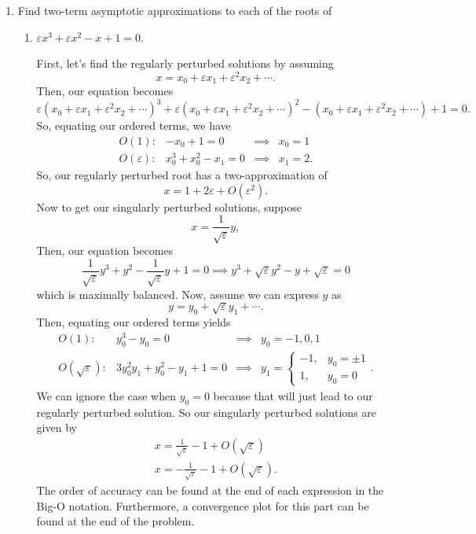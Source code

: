 \documentclass[a4paper,12pt]{article}
\newcommand{\eps}{\varepsilon}
\begin{document}
\begin{enumerate}[label = \arabic*)]
    \item Find two-term asymptotic approximations to each of the roots of
    \begin{enumerate}[label = (\alph*)]
        \item $ \eps x^3 + \eps x^2 - x + 1 = 0 $.

        First, let's find the regularly perturbed solutions by assuming
        \[
            x = x_0 + \eps x_1 + \eps^2 x_2 + \cdots.
        \]
        Then, our equation becomes
        \[
            \eps(x_0 + \eps x_1 + \eps^2 x_2 + \cdots)^3 + 
            \eps(x_0 + \eps x_1 + \eps^2 x_2 + \cdots)^2 - 
            (x_0 + \eps x_1 + \eps^2 x_2 + \cdots) + 1 = 0.
        \]
        So, equating our ordered terms, we have
        \[
        	\begin{array}{rccl}
            	O(1): & - x_0 + 1 = 0 & \implies & x_0 = 1 \\
            	O(\eps): & x_0^3 + x_0^2 - x_1 = 0 & \implies & x_1 = 2.
        	\end{array}
       \] 
        So, our regularly perturbed root has a two-approximation of
        \[
            \boxed{x = 1 + 2\eps + O(\eps^2).}
        \]
        Now to get our singularly perturbed solutions, suppose
        \[
        	x = \frac{1}{\sqrt{\eps}} y,
        \]
        Then, our equation becomes
        \[
        	\frac{1}{\sqrt{\eps}} y^3 + y^2 - \frac{1}{\sqrt{\eps}} y + 1 = 0 \implies y^3 + \sqrt{\eps} y^2 - y + \sqrt{\eps} = 0
        \]
        which is maximally balanced. Now, assume we can express $ y $ as 
        \[
        	y = y_0 + \sqrt{\eps} y_1 + \cdots.
        \]
        Then, equating our ordered terms yields
        \[
        	\begin{array}{rccl}
        		O(1): &  y_0^3 - y_0 = 0 & \implies & y_0 = -1, 0, 1 \\
        		O(\sqrt{\eps}): & 3y_0^2 y_1 + y_0^2 - y_1 + 1 = 0 & \implies & y_1 = 
        		\begin{cases}
        			-1, & y_0 = \pm 1 \\
        			1, & y_0 = 0
        		\end{cases}.
        	\end{array}
        \]
        We can ignore the case when $ y_0 = 0 $ because that will just lead to our regularly perturbed solution. So our singularly perturbed solutions are given by
        \[
        	\boxed{\begin{array}{l}
        		x = \frac{1}{\sqrt{\eps}} - 1 + O(\sqrt{\eps}) \\
        		x = -\frac{1}{\sqrt{\eps}} - 1 + O(\sqrt{\eps}).
        	\end{array}}
        \]
        The order of accuracy can be found at the end of each expression in the Big-O notation. Furthermore, a convergence plot for this part can be found at the end of the problem.
        

\end{enumerate}
\end{enumerate}
\end{document}
